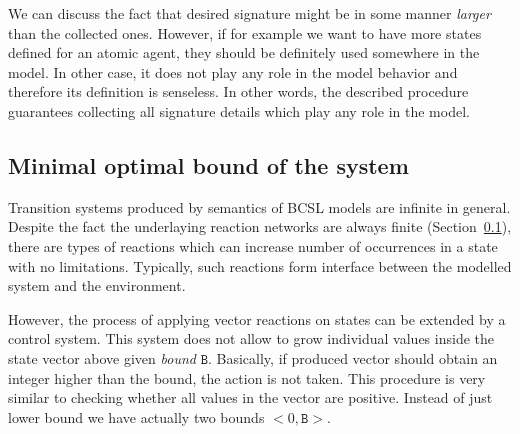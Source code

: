 \documentclass[12pt]{fithesis2}
\newenvironment{proof}{\noindent\textit{Proof:~ }\nopagebreak}{\bigskip}
\newcommand*{\QEDA}{\hfill\ensuremath{\blacksquare}}%
\begin{document}
We can discuss the fact that desired signature might be in some manner \emph{larger} than the collected ones. However, if for example we want to have more states defined for an atomic agent, they should be definitely used somewhere in the model. In other case, it does not play any role in the model behavior and therefore its definition is senseless. In other words, the described procedure guarantees collecting all signature details which play any role in the model.


\subsection{Minimal optimal bound of the system}
\label{optimal_bound}

Transition systems produced by semantics of BCSL models are infinite in general. Despite the fact the underlaying reaction networks are always finite (Section~\ref{optimal_bound}), there are types of reactions which can increase number of occurrences in a state with no limitations. Typically, such reactions form interface between the modelled system and the environment.

However, the process of applying vector reactions on states can be extended by a control system. This system does not allow to grow individual values inside the state vector above given \emph{bound} $\mathtt{B}$. Basically, if produced vector should obtain an integer higher than the bound, the action is not taken. This procedure is very similar to checking whether all values in the vector are positive. Instead of just lower bound we have actually two bounds $<0, \mathtt{B}>$.
\end{document}
